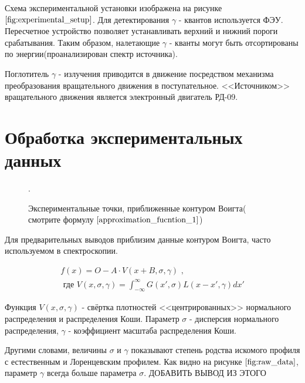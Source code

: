 \documentclass[a4paper, 14pt]{article}
\begin{document}
Схема экспериментальной установки изображена на рисунке $\ref{fig:experimental_setup}$.
Для детектирования $\gamma$ - квантов используется ФЭУ. Пересчетное устройство позволяет
устанавливать верхний и нижний пороги срабатывания. Таким образом, налетающие $\gamma$ - кванты
могут быть отсортированы по энергии(проанализирован спектр источника).

Поглотитель $\gamma$ - излучения приводится в движение посредством механизма преобразования
вращательного движения в поступательное. <<Источником>> вращательного движения является
электронный двигатель РД-09.






\section*{\textcolor{header}{Обработка экспериментальных данных}}

\begin{figure}[hbtp]
    \begin{center}
        
    \end{center}
    \caption{Экспериментальные точки, приближенные контуром Воигта( смотрите формулу $\ref{approximation_fucntion_1}$)}.
    \label{fig:raw_data}
\end{figure}

Для предварительных выводов приблизим данные контуром Воигта, часто
используемом в спектроскопии.

\begin{equation}
    \begin{aligned}
        f(x) = O - A \cdot V(x + B, \sigma, \gamma) \text{ ,} \\
        \text{ где } V(x, \sigma, \gamma) = \int_{- \infty}^{\infty} G(x', \sigma) L(x - x', \gamma) dx'
    \end{aligned}
    \label{approximation_fucntion_1}
\end{equation}

Функция $V(x, \sigma, \gamma)$ - свёртка плотностей <<центрированных>> нормального распределения и распределения Коши.
Параметр $\sigma$ - дисперсия нормального распределения, $\gamma$ - коэффициент масштаба распределения Коши.

Другими словами, величины $\sigma$ и $\gamma$ показывают степень родства искомого профиля с естественным и Лоренцевским профилем.
Как видно на рисунке $\ref{fig:raw_data}$, параметр $\gamma$ всегда больше параметра $\sigma$. ДОБАВИТЬ ВЫВОД ИЗ ЭТОГО
\end{document}
